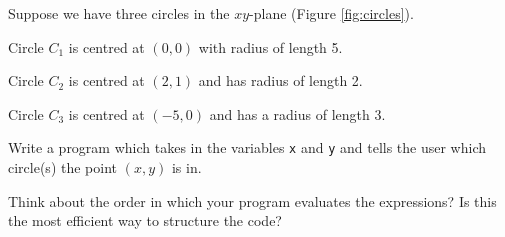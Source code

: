 \documentclass[11pt]{report}
\begin{document}
\begin{Exercise}[title=Putting it all together: Circles] 
    
    Suppose we have three circles in the $xy$-plane (Figure \ref{fig:circles}). 
    
    Circle $C_1$ is centred at $(0, 0)$ with radius of length 5. 
    
    Circle $C_2$ is centred at $(2, 1)$ and has radius of length 2. 
    
    Circle $C_3$ is centred at $(-5, 0)$ and has a radius of length 3. 
    
    Write a program which takes in the variables {\tt x} and {\tt y} and tells the user which circle(s) the point $(x, y)$ is in. 
    
    Think about the order in which your program evaluates the expressions? Is this the most efficient way to structure the code? 
    
\end{Exercise}
\end{document}

